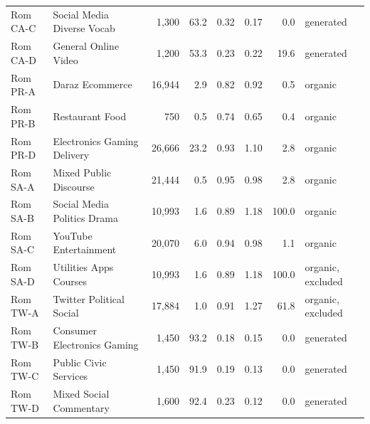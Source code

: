 \begin{tabular}{llrrrrrl}
Rom CA-C & Social Media Diverse Vocab & 1,300 & 63.2 & 0.32 & 0.17 & 0.0 & generated \\
Rom CA-D & General Online Video & 1,200 & 53.3 & 0.23 & 0.22 & 19.6 & generated \\
Rom PR-A & Daraz Ecommerce & 16,944 & 2.9 & 0.82 & 0.92 & 0.5 & organic \\
Rom PR-B & Restaurant Food & 750 & 0.5 & 0.74 & 0.65 & 0.4 & organic \\
Rom PR-D & Electronics Gaming Delivery & 26,666 & 23.2 & 0.93 & 1.10 & 2.8 & organic \\
Rom SA-A & Mixed Public Discourse & 21,444 & 0.5 & 0.95 & 0.98 & 2.8 & organic \\
Rom SA-B & Social Media Politics Drama & 10,993 & 1.6 & 0.89 & 1.18 & 100.0 & organic \\
Rom SA-C & YouTube Entertainment & 20,070 & 6.0 & 0.94 & 0.98 & 1.1 & organic \\
Rom SA-D & Utilities Apps Courses & 10,993 & 1.6 & 0.89 & 1.18 & 100.0 & organic, excluded \\
Rom TW-A & Twitter Political Social & 17,884 & 1.0 & 0.91 & 1.27 & 61.8 & organic, excluded \\
Rom TW-B & Consumer Electronics Gaming & 1,450 & 93.2 & 0.18 & 0.15 & 0.0 & generated \\
Rom TW-C & Public Civic Services & 1,450 & 91.9 & 0.19 & 0.13 & 0.0 & generated \\
Rom TW-D & Mixed Social Commentary & 1,600 & 92.4 & 0.23 & 0.12 & 0.0 & generated \\
\bottomrule
\end{tabular}

